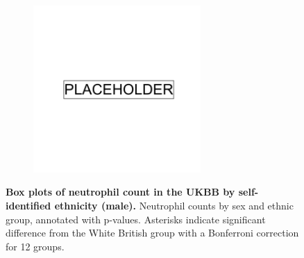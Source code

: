 \begin{figure}[ht]
    \centering
    \begin{subfigure}{\textwidth}
    \includegraphics[width=0.7\textwidth]{placeholder.png}
    \end{subfigure}
    \caption[Box plots of neutrophil count in the UKBB by self-identified ethnicity (male)]{\textbf{Box plots of neutrophil count in the UKBB by self-identified ethnicity (male).} Neutrophil counts by sex and ethnic group, annotated with p-values. Asterisks indicate significant difference from the White British group with a Bonferroni correction for 12 groups.}
    \label{fig:supp_box_neutrophill_m}
\end{figure}

\newpage

